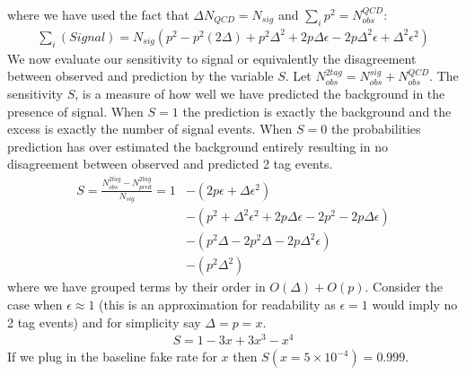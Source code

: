 where we have used the fact that $\Delta N_{QCD} = N_{sig}$ and $\sum_i p^2 = N_{obs}^{QCD}$:
\begin{align*}
\sum_i(Signal) =  N_{sig}(  p^2 - p^2(2\Delta) + p^2\Delta^2 + 2p\Delta \epsilon - 2 p \Delta^2 \epsilon + \Delta^2 \epsilon^2)
\end{align*}
We now evaluate our sensitivity to signal or equivalently the disagreement between observed and prediction by the variable $S$. Let 
$N_{obs}^{2tag} = N_{obs}^{sig} + N_{obs}^{QCD}$. The sensitivity $S$, is a measure of how well we have predicted the background
in the presence of signal. When $S=1$ the prediction is exactly the background and the excess is exactly the number of signal events. 
When $S=0$ the probabilities prediction has over estimated the background entirely resulting in no disagreement between observed and predicted 
2 tag events.
\begin{align*}
S = \frac{N_{obs}^{2tag} - N_{pred}^{2tag} }{N_{sig}} = 1 &- (2p\epsilon + \Delta \epsilon^2) \\
&- (p^2 + \Delta^2\epsilon^2 +  2p\Delta\epsilon -2p^2  - 2p\Delta\epsilon) \\
&- (p^2\Delta -2p^2\Delta -2p\Delta^2\epsilon) \\
&- (p^2\Delta^2)
\end{align*}
where we have grouped terms by their order in $O(\Delta)+O(p)$. Consider the case when
$\epsilon \approx 1$ (this is an approximation for readability as $\epsilon=1$ would imply no 2 tag events) and for simplicity say $\Delta = p = x$.
\begin{align*}
S= 1 - 3x + 3 x^3 - x^4
\end{align*}
If we plug in the baseline fake rate for $x$  then $S(x=5\times10^{-4})= 0.999$. 
